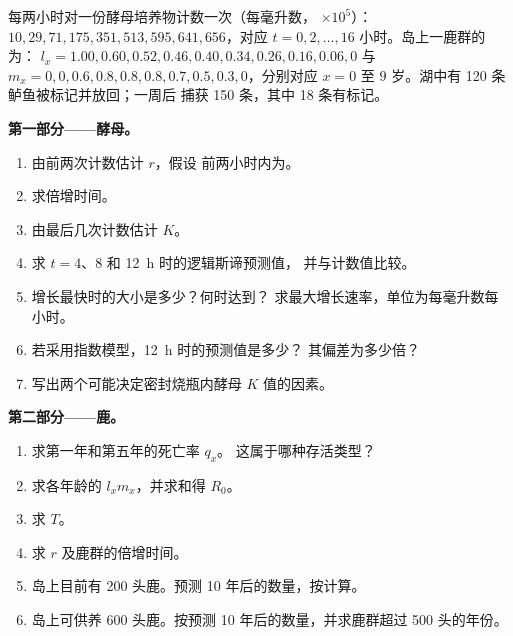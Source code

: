 \begin{problem}
\label{pb:b1:populations:1}
每两小时对一份酵母培养物计数一次（每毫升数，
$\times 10^5$）：$10, 29, 71, 175, 351, 513, 595, 641, 656$，对应 $t = 0,
2, \ldots, 16$ 小时。岛上一鹿群的为：
$l_x = 1.00, 0.60, 0.52, 0.46, 0.40, 0.34, 0.26, 0.16, 0.06, 0$ 与
$m_x = 0, 0, 0.6, 0.8, 0.8, 0.8, 0.7, 0.5, 0.3, 0$，分别对应 $x = 0$ 至 $9$
岁。湖中有 120 条鲈鱼被标记并放回；一周后
捕获 150 条，其中 18 条有标记。

\medskip
\noindent\textbf{第一部分——酵母。}
\begin{enumerate}
  \item 由前两次计数估计 $r$，假设
        前两小时内为。
  \item 求倍增时间。
  \item 由最后几次计数估计 $K$。
  \item 求 $t = 4$、$8$ 和 \qty{12}{h} 时的逻辑斯谛预测值，
        并与计数值比较。
  \item 增长最快时的大小是多少？何时达到？
        求最大增长速率，单位为每毫升数每
        小时。
  \item 若采用指数模型，\qty{12}{h} 时的预测值是多少？
        其偏差为多少倍？
  \item 写出两个可能决定密封烧瓶内酵母
        $K$ 值的因素。
\end{enumerate}

\medskip
\noindent\textbf{第二部分——鹿。}
\begin{enumerate}[resume]
  \item 求第一年和第五年的死亡率 $q_x$。
        这属于哪种存活类型？
  \item 求各年龄的 $l_x m_x$，并求和得 $R_0$。
  \item 求 $T$。
  \item 求 $r$ 及鹿群的倍增时间。
  \item 岛上目前有 200 头鹿。预测 10
        年后的数量，按计算。
  \item 岛上可供养 600 头鹿。按预测
        10 年后的数量，并求鹿群超过 500 头的年份。
\end{enumerate}


\end{problem}
